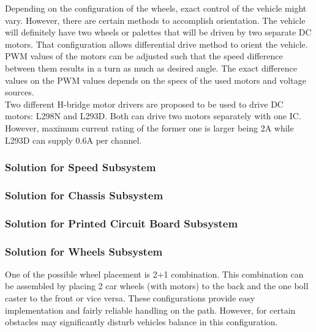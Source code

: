 \documentclass[a4paper,12pt]{article}
\begin{document}
		
			Depending on the configuration of the wheels, exact control of the vehicle might vary. However, there are certain methods to accomplish orientation. The vehicle will definitely have two wheels or palettes that will be driven by two separate DC motors. That configuration allows differential drive method to orient the vehicle. PWM values of the motors can be adjusted such that the speed difference between them results in a turn as much as desired angle. The exact difference values on the PWM values depends on the specs of the used motors and voltage sources. \\

			Two different H-bridge motor drivers are proposed to be used to drive DC motors: L298N and L293D. Both can drive two motors separately with one IC. However, maximum current rating of the former one is larger being 2A while L293D can supply 0.6A per channel. \\

			
			
		\subsubsection{Solution for Speed Subsystem}

			

		
		\subsubsection{Solution for Chassis Subsystem}
			
			
			
		\subsubsection{Solution for Printed Circuit Board Subsystem}
			
	
		
		\subsubsection{Solution for Wheels Subsystem}
			
	
			One of the possible wheel placement is 2+1 combination. This combination can be assembled by placing 2 car wheels (with motors) to the back and the one boll caster to the front or vice versa. These configurations provide easy implementation and fairly reliable handling on the path. However, for certain obstacles may significantly disturb vehicles balance in this configuration.\\
\end{document}

